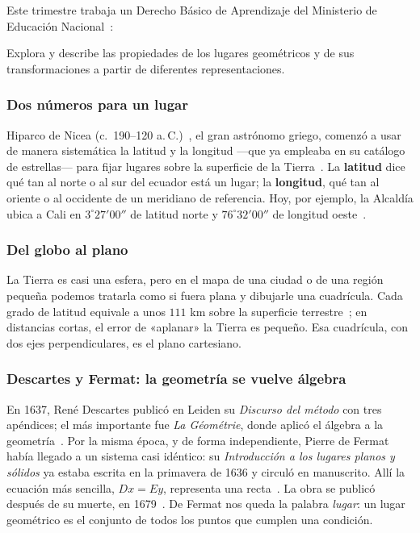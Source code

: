 \documentclass[11pt]{article}
\begin{document}
Este trimestre trabaja un Derecho Básico de Aprendizaje del Ministerio de
Educación Nacional~\cite{mendba}:

\begin{dba}
Explora y describe las propiedades de los lugares geométricos y de sus
transformaciones a partir de diferentes representaciones.
\end{dba}


\subsubsection*{Dos números para un lugar}

Hiparco de Nicea (c.~190--120 a.\,C.)~\cite{mactutorhiparco}, el gran
astrónomo griego, comenzó a usar de manera sistemática la latitud y la
longitud —que ya empleaba en su catálogo de estrellas— para fijar lugares
sobre la superficie de la Tierra~\cite{ebsco}. La \textbf{latitud} dice qué
tan al norte o al sur del ecuador está un lugar; la \textbf{longitud}, qué tan
al oriente o al occidente de un meridiano de referencia. Hoy, por ejemplo, la
Alcaldía ubica a Cali en $3^\circ 27' 00''$ de latitud norte y
$76^\circ 32' 00''$ de longitud oeste~\cite{alcaldia}.

\subsubsection*{Del globo al plano}

La Tierra es casi una esfera, pero en el mapa de una ciudad o de una región
pequeña podemos tratarla como si fuera plana y dibujarle una cuadrícula. Cada
grado de latitud equivale a unos $111$ km sobre la superficie
terrestre~\cite{noaa}; en distancias cortas, el error de «aplanar» la Tierra
es pequeño. Esa cuadrícula, con dos ejes perpendiculares, es el plano
cartesiano.

\subsubsection*{Descartes y Fermat: la geometría se vuelve álgebra}

En 1637, René Descartes publicó en Leiden su \emph{Discurso del método} con
tres apéndices; el más importante fue \emph{La Géométrie}, donde aplicó el
álgebra a la geometría~\cite{mactutordescartes,descartes}. Por la misma época,
y de forma independiente, Pierre de Fermat había llegado a un sistema casi
idéntico: su \emph{Introducción a los lugares planos y sólidos} ya estaba
escrita en la primavera de 1636 y circuló en manuscrito. Allí la ecuación más
sencilla, $Dx = Ey$, representa una recta~\cite{mahoney}. La obra se publicó
después de su muerte, en 1679~\cite{fermat}. De Fermat nos queda la palabra
\emph{lugar}: un lugar geométrico es el conjunto de todos los puntos que
cumplen una condición.
\end{document}
